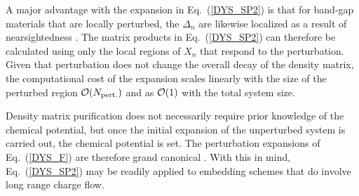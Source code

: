 \documentclass[prl,aps,twocolumn,showpacs,twocolumngrid,superbib]{revtex4}
\begin{document}
A major advantage with the expansion in Eq.\ (\ref{DYS_SP2}) is that for band-gap 
materials that are locally perturbed, the $\Delta_n$ are likewise localized as a result 
of nearsightedness \cite{Kohn59,Kohn96}. The matrix products in Eq.\ (\ref{DYS_SP2}) 
can therefore be calculated using only the local regions of $X_n$ that respond to the perturbation.
Given that perturbation does not change the overall decay of the
density matrix, the computational cost of the expansion scales linearly with the
size of the perturbed region ${\cal O}(N_{\rm pert.})$ and as ${\cal O}(1)$ with
the total system size.

Density matrix purification does not necessarily require
prior knowledge of the chemical potential, but once the
initial expansion of the unperturbed system is carried out, the
chemical potential is set. The perturbation expansions of 
Eq.\ (\ref{DYS_F}) are therefore grand canonical \cite{CPRT}.
With this in mind, Eq.~(\ref{DYS_SP2}) may be readily applied 
to embedding schemes that do involve long range charge flow.
\end{document}
